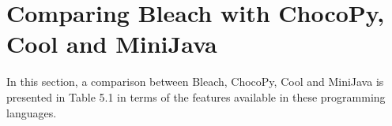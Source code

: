 \begin{comment}
  let queue = Queue();
  queue.push(source);

  while(!queue.empty()){
    let currNode = queue.pop();

    for(let i = 0; i < adjacencyList.getAt(currNode).size(); i = i + 1){
      let neighbor = adjacencyList.getAt(currNode).getAt(i);

      if(!visited.getAt(neighbor)){
        visited.setAt(neighbor, true);
        distance.setAt(neighbor, 1 + distance.getAt(currNode));
        queue.push(neighbor);
      }
    }
  }

  return;
}
        \end{lstlisting}
    \item Dijkstra's Shortest Path Algorithm
        \begin{lstlisting}
function dijkstraAlgorithm(source, adjacencyList, distance){
  let minHeap = MinBinaryHeap(); // Modified to receive lists of 2 elements.
  distance.setAt(source, 0);

  minHeap.push([0, source]);

  while(!minHeap.empty()){
    let currNodeInfo = minHeap.pop();
    let minPath = currNodeInfo.getAt(0);
    let currNode = currNodeInfo.getAt(1);

    for(let i = 0; i < adjacencyList.getAt(currNode).size(); i = i + 1){
      let neighbour = adjacencyList.getAt(currNode).getAt(i).getAt(0);
      let edge = adjacencyList.getAt(currNode).getAt(i).getAt(1);
      if(distance.getAt(currNode) + edge < distance.getAt(neighbour)){
        distance.setAt(neighbour, distance.getAt(currNode) + edge);
        minHeap.push([distance.getAt(neighbour), neighbour]);
      }
    }
  }

  return;
}
        \end{lstlisting}
\end{itemize}

\newpage

\end{comment}

\section{Comparing Bleach with ChocoPy, Cool and MiniJava}
In this section, a comparison between Bleach, ChocoPy, Cool and MiniJava is presented in Table 5.1 in terms of the features available in these programming languages.


